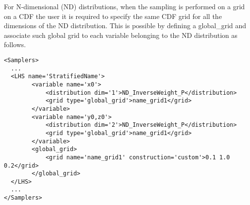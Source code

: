For N-dimensional  (ND) distributions, when the sampling is performed on a grid on a CDF  the user it is required to specify the same CDF grid for all the dimensions of the ND distribution.
This is possible by defining a global_grid and associate such global grid to each variable belonging to the ND distribution as follows.

\begin{lstlisting}[style=XML,morekeywords={ND,grid}]
<Samplers>
  ...
  <LHS name='StratifiedName'> 
        <variable name='x0'>
            <distribution dim='1'>ND_InverseWeight_P</distribution>
            <grid type='global_grid'>name_grid1</grid>
        </variable>
        <variable name='y0,z0'>
            <distribution dim='2'>ND_InverseWeight_P</distribution>
            <grid type='global_grid'>name_grid1</grid>
        </variable>
        <global_grid>
            <grid name='name_grid1' construction='custom'>0.1 1.0 0.2</grid>
        </global_grid>
  </LHS>
  ...
</Samplers>
\end{lstlisting}

